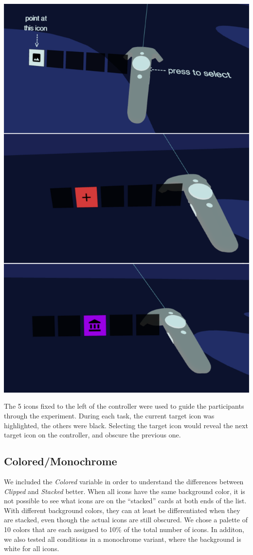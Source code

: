 \documentclass[nobib]{tufte-book} %
\begin{document}
\begin{marginfigure}
  \includegraphics[width=\linewidth]{controllers.png}
  \caption{The 5 icons fixed to the left of the controller were used to guide the participants through the experiment. During each task, the current target icon was highlighted, the others were black. Selecting the target icon would reveal the next target icon on the controller, and obscure the previous one.}
  \label{fig:controllers}
\end{marginfigure}

\subsection{Colored/Monochrome}
We included the \emph{Colored} variable in order to understand the differences between \emph{Clipped} and \emph{Stacked} better. When all icons have the same background color, it is not possible to see what icons are on the ``stacked'' cards at both ends of the list. With different background colors, they can at least be differentiated when they are stacked, even though the actual icons are still obscured. We chose a palette of 10 colors that are each assigned to 10\% of the total number of icons. In additon, we also tested all conditions in a monochrome variant, where the background is white for all icons.
\end{document}
